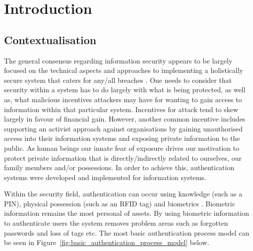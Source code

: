 
\chapter{Introduction}  %

\ifpdf
    \graphicspath{{Chapter1/Figs/Raster/}{Chapter1/Figs/PDF/}{Chapter1/Figs/}}
\else
    \graphicspath{{Chapter1/Figs/Vector/}{Chapter1/Figs/}}
\fi


\section{Contextualisation} %

The general consensus regarding information security appears to be largely focused on the technical aspects and approaches to implementing a holistically secure system that caters for any/all breaches \citep{Anderson2001}. One needs to consider that security within a system has to do largely with what is being protected, as well as, what malicious incentives attackers may have for wanting to gain access to information within that particular system. Incentives for attack tend to skew largely in favour of financial gain. However, another common incentive includes supporting an activist approach against organisations by gaining unauthorised access into their information systems and exposing private information to the public. As human beings our innate fear of exposure drives our motivation to protect private information that is directly/indirectly related to ourselves, our family members and/or possessions. In order to achieve this, authentication systems were developed and implemented for information systems. 

Within the security field, authentication can occur using knowledge (such as a PIN), physical possession (such as an RFID tag) and biometrics \citep{Liu2001}. Biometric information remains the most personal of assets. By using biometric information to authenticate users the system removes problem areas such as forgotten passwords and loss of tags etc. The most basic authentication process model can be seen in Figure~\ref{fig:basic_authentication_process_model} below.



